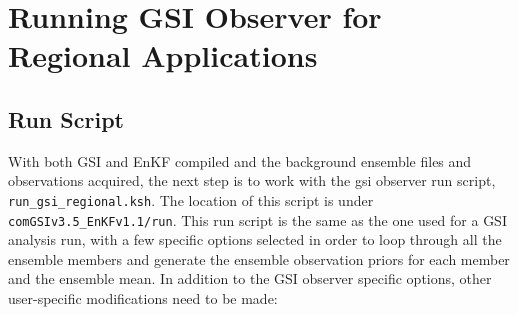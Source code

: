 \section{Running GSI Observer for Regional Applications}

\subsection{Run Script}

With both GSI and EnKF compiled and the background ensemble files and observations acquired, 
the next step is to work with the gsi observer run script, \verb|run_gsi_regional.ksh|. The location of this 
script is under \verb|comGSIv3.5_EnKFv1.1/run|. This run script is the same as the one used for 
a GSI analysis run, with a few specific options selected in order to loop through all the ensemble 
members and generate the ensemble observation priors for each member and the ensemble 
mean. In addition to the GSI observer specific options, other user-specific modifications need 
to be made:

